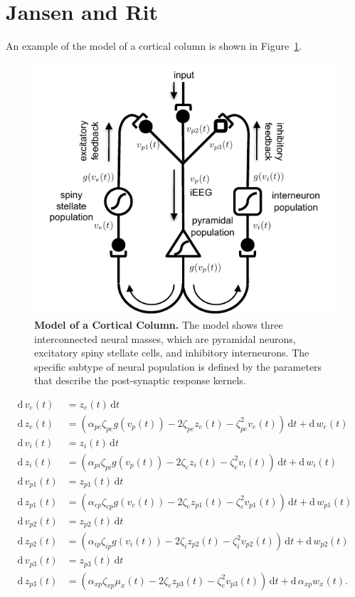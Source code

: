 \documentclass[]{article}
\begin{document}
\section{Jansen and Rit}
An example of the model of a cortical column is shown in Figure~\ref{fig:JansenAndRit}.
\begin{figure}[ht]
	\centering
		\includegraphics[scale=1]{./Figures/pdf/JansenAndRit.pdf}
	\caption{\textbf{Model of a Cortical Column.} The model shows three interconnected neural masses, which are pyramidal neurons, excitatory spiny stellate cells, and inhibitory interneurons. The specific subtype of neural population is defined by the parameters that describe the post-synaptic response kernels.}
	\label{fig:JansenAndRit}
\end{figure}

\begin{align}
	\mathrm{d}\,v_e(t) &= z_e(t)\,\mathrm{d}t \\
	\mathrm{d}\,z_e(t) &= (\alpha_{pe}\zeta_{pe}g\left(v_p(t)\right) - 2\zeta_{pe}z_e(t) - \zeta_{pe}^2v_e(t))\,\mathrm{d}t + \mathrm{d}\,w_e(t) \\
	\mathrm{d}\,v_i(t) &= z_i(t)\,\mathrm{d}t \\
	\mathrm{d}\,z_i(t) &= \left(\alpha_{pi}\zeta_{pi}g\left(v_p(t)\right) - 2\zeta_{e}z_i(t) - \zeta_{e}^2v_i(t)\right)\,\mathrm{d}t + \mathrm{d}\,w_i(t)\\
	\mathrm{d}\,v_{p1}(t) &= z_{p1}(t)\,\mathrm{d}t \\
	\mathrm{d}\,z_{p1}(t) &= (\alpha_{ep}\zeta_{ep}g\left(v_e(t)\right) - 2\zeta_{e}z_{p1}(t) - \zeta_{e}^2v_{p1}(t))\,\mathrm{d}t + \mathrm{d}\, w_{p1}(t)\\
	\mathrm{d}\,v_{p2}(t) &= z_{p2}(t)\,\mathrm{d}t \\
	\mathrm{d}\,z_{p2}(t) &= (\alpha_{ip}\zeta_{ip}g\left(v_i(t)\right) - 2\zeta_{i}z_{p2}(t) - \zeta_{i}^2v_{p2}(t))\,\mathrm{d}t  + \mathrm{d}\, w_{p2}(t) \\
	\mathrm{d}\,v_{p3}(t) &= z_{p3}(t)\,\mathrm{d}t \\
	\mathrm{d}\,z_{p3}(t) &= (\alpha_{xp}\zeta_{xp}\mu_x(t) - 2\zeta_{e}z_{p3}(t) - \zeta_{e}^2v_{p3}(t))\,\mathrm{d}t + \mathrm{d}\,\alpha_{xp}w_x(t).
\end{align}
\end{document}
